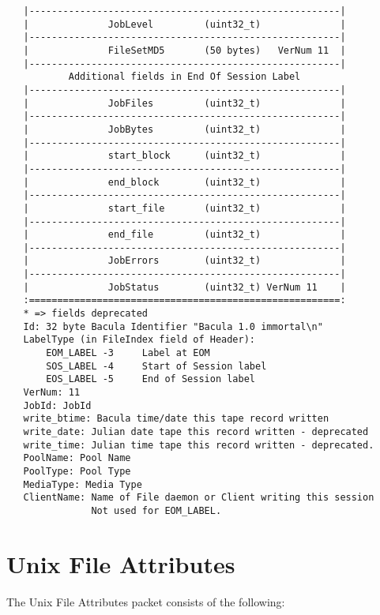 \begin{verbatim}
   |-------------------------------------------------------|
   |              JobLevel         (uint32_t)              |
   |-------------------------------------------------------|
   |              FileSetMD5       (50 bytes)   VerNum 11  |
   |-------------------------------------------------------|
           Additional fields in End Of Session Label
   |-------------------------------------------------------|
   |              JobFiles         (uint32_t)              |
   |-------------------------------------------------------|
   |              JobBytes         (uint32_t)              |
   |-------------------------------------------------------|
   |              start_block      (uint32_t)              |
   |-------------------------------------------------------|
   |              end_block        (uint32_t)              |
   |-------------------------------------------------------|
   |              start_file       (uint32_t)              |
   |-------------------------------------------------------|
   |              end_file         (uint32_t)              |
   |-------------------------------------------------------|
   |              JobErrors        (uint32_t)              |
   |-------------------------------------------------------|
   |              JobStatus        (uint32_t) VerNum 11    |
   :=======================================================:
   * => fields deprecated
   Id: 32 byte Bacula Identifier "Bacula 1.0 immortal\n"
   LabelType (in FileIndex field of Header):
       EOM_LABEL -3     Label at EOM
       SOS_LABEL -4     Start of Session label
       EOS_LABEL -5     End of Session label
   VerNum: 11
   JobId: JobId
   write_btime: Bacula time/date this tape record written
   write_date: Julian date tape this record written - deprecated
   write_time: Julian time tape this record written - deprecated.
   PoolName: Pool Name
   PoolType: Pool Type
   MediaType: Media Type
   ClientName: Name of File daemon or Client writing this session
               Not used for EOM_LABEL.
\end{verbatim}
\normalsize

\section{Unix File Attributes}

The Unix File Attributes packet consists of the following:

